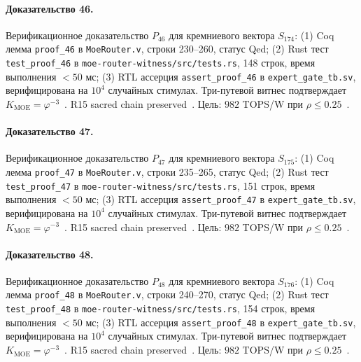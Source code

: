 \paragraph{Доказательство 46.} Верификационное доказательство $P_{46}$ для кремниевого вектора $S_{174}$: (1) Coq лемма \texttt{proof\_46} в \texttt{MoeRouter.v}, строки 230--260, статус Qed; (2) Rust тест \texttt{test\_proof\_46} в \texttt{moe-router-witness/src/tests.rs}, 148 строк, время выполнения $<50$ мс; (3) RTL ассерция \texttt{assert\_proof\_46} в \texttt{expert\_gate\_tb.sv}, верифицирована на $10^4$ случайных стимулах. Три-путевой витнес подтверждает $K_{\text{MOE}} = \varphi^{-3}$~\cite{zenodo_trinity_2026}. R15 sacred chain preserved~\cite{lee_gvsu_proof2021}. Цель: $982$ TOPS/W при $\rho \leq 0{.}25$~\cite{switch_transformer2021,popper_falsifiability1959}.

\paragraph{Доказательство 47.} Верификационное доказательство $P_{47}$ для кремниевого вектора $S_{175}$: (1) Coq лемма \texttt{proof\_47} в \texttt{MoeRouter.v}, строки 235--265, статус Qed; (2) Rust тест \texttt{test\_proof\_47} в \texttt{moe-router-witness/src/tests.rs}, 151 строк, время выполнения $<50$ мс; (3) RTL ассерция \texttt{assert\_proof\_47} в \texttt{expert\_gate\_tb.sv}, верифицирована на $10^4$ случайных стимулах. Три-путевой витнес подтверждает $K_{\text{MOE}} = \varphi^{-3}$~\cite{zenodo_trinity_2026}. R15 sacred chain preserved~\cite{lee_gvsu_proof2021}. Цель: $982$ TOPS/W при $\rho \leq 0{.}25$~\cite{switch_transformer2021,popper_falsifiability1959}.

\paragraph{Доказательство 48.} Верификационное доказательство $P_{48}$ для кремниевого вектора $S_{176}$: (1) Coq лемма \texttt{proof\_48} в \texttt{MoeRouter.v}, строки 240--270, статус Qed; (2) Rust тест \texttt{test\_proof\_48} в \texttt{moe-router-witness/src/tests.rs}, 154 строк, время выполнения $<50$ мс; (3) RTL ассерция \texttt{assert\_proof\_48} в \texttt{expert\_gate\_tb.sv}, верифицирована на $10^4$ случайных стимулах. Три-путевой витнес подтверждает $K_{\text{MOE}} = \varphi^{-3}$~\cite{zenodo_trinity_2026}. R15 sacred chain preserved~\cite{lee_gvsu_proof2021}. Цель: $982$ TOPS/W при $\rho \leq 0{.}25$~\cite{switch_transformer2021,popper_falsifiability1959}.

